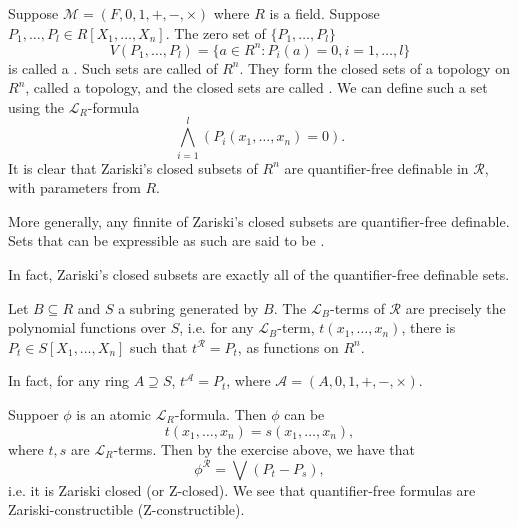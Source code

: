 \documentclass[notoc,notitlepage]{tufte-book}
\begin{document}
\begin{eg}
  Suppose $\mathcal{M} = (F, 0, 1, +, -, \times)$ where $R$ is a field. Suppose $P_1, \ldots, P_l \in R[X_1, \ldots, X_n]$. The zero set of $\{ P_1, \ldots, P_l \}$
  \begin{equation*}
    V ( P_1, \ldots, P_l ) = \{ a \in R^n : P_i(a) = 0, i = 1, \ldots, l \}
  \end{equation*}
  is called a . Such sets are called  of $R^n$. They form the closed sets of a topology on $R^n$, called a  topology, and the closed sets are called . We can define such a set using the $\mathcal{L}_R$-formula
  \begin{equation*}
    \bigwedge_{i=1}^{l} \left( P_i (x_1, \ldots, x_n) = 0 \right).
  \end{equation*}
  It is clear that Zariski's closed subsets of $R^n$ are quantifier-free definable in $\mathcal{R}$, with parameters from $R$.

  More generally, any finnite  of Zariski's closed subsets are quantifier-free definable. Sets that can be expressible as such are said to be .
\end{eg}

In fact, Zariski's closed subsets are exactly all of the quantifier-free definable sets.

\begin{ex}
  Let $B \subseteq R$ and $S$ a subring generated by $B$. The $\mathcal{L}_B$-terms of $\mathcal{R}$ are precisely the polynomial functions over $S$, i.e. for any $\mathcal{L}_B$-term, $t(x_1, \ldots, x_n)$, there is $P_t \in S[ X_1, \ldots, X_n ]$ such that $t^\mathcal{R} = P_t$, as functions on $R^n$.

  In fact, for any ring $A \supseteq S$, $t^\mathcal{A} = P_t$, where $\mathcal{A} = (A, 0, 1, +, -, \times)$.
\end{ex}

Suppoer $\phi$ is an atomic $\mathcal{L}_R$-formula. Then $\phi$ can be
\begin{equation*}
  t (x_1, \ldots, x_n) = s (x_1, \ldots, x_n),
\end{equation*}
where $t, s$ are $\mathcal{L}_R$-terms. Then by the exercise above, we have that
\begin{equation*}
  \phi^\mathcal{R} = \bigvee ( P_t - P_s ),
\end{equation*}
i.e. it is Zariski closed (or Z-closed). We see that quantifier-free formulas are Zariski-constructible (Z-constructible).
\end{document}
